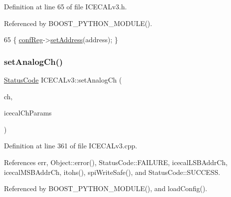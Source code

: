 Definition at line 65 of file I\+C\+E\+C\+A\+Lv3.\+h.



Referenced by B\+O\+O\+S\+T\+\_\+\+P\+Y\+T\+H\+O\+N\+\_\+\+M\+O\+D\+U\+L\+E().


\begin{DoxyCode}
65 \{   \hyperlink{classICECALv3_a6e8b6c03f5b0f1d8281bf8a0fa46064f}{confReg}->\hyperlink{classIOobject_ae0d372aaeafe3da3c239677118deb2ac}{setAddress}(address);   \}
\end{DoxyCode}
\mbox{\label{classICECALv3_a9578e4d13c250d8bc417f68c79d6a21d}} 
\subsubsection{\texorpdfstring{set\+Analog\+Ch()}{setAnalogCh()}}
{\footnotesize\ttfamily \hyperlink{classStatusCode}{Status\+Code} I\+C\+E\+C\+A\+Lv3\+::set\+Analog\+Ch (\begin{DoxyParamCaption}\item[{int}]{ch,  }\item[{Py\+Object $\ast$}]{icecal\+Ch\+Params }\end{DoxyParamCaption})}



Definition at line 361 of file I\+C\+E\+C\+A\+Lv3.\+cpp.



References err, Object\+::error(), Status\+Code\+::\+F\+A\+I\+L\+U\+RE, icecal\+L\+S\+B\+Addr\+Ch, icecal\+M\+S\+B\+Addr\+Ch, itohs(), spi\+Write\+Safe(), and Status\+Code\+::\+S\+U\+C\+C\+E\+SS.



Referenced by B\+O\+O\+S\+T\+\_\+\+P\+Y\+T\+H\+O\+N\+\_\+\+M\+O\+D\+U\+L\+E(), and load\+Config().


